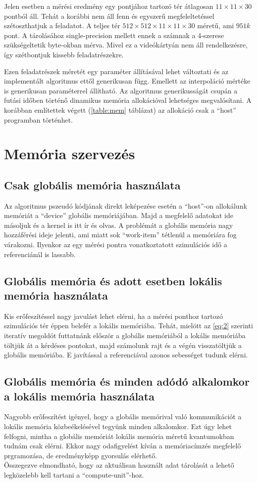 	Jelen esetben a mérési eredmény egy pontjához tartozó tér átlagosan
	$11\times11\times30$ pontból áll.
	Tehát a korábbi nem áll fenn és egyszerű megfeleltetéssel szétoszthatjuk a
	feladatot.
	A teljes tér $512\times512\times11\times11\times30$ méretű, ami $951k$ pont.
	A tárolásához single-precision mellett ennek a számnak a 4-szerese
	szükségeltetik byte-okban mérva. Mivel ez a videókártyán nem áll
	rendelkezésre, így szétbontjuk kissebb feladatrészekre.
	
	Ezen feladatrészek méretét egy paraméter állításával lehet változtati és az
	implementált algoritmus ettől generikusan függ.
	Emellett az interpoláció mértéke is generikusan paraméterrel állítható.
	Az algoritmus generikusságát csupán a futási időben történő dinamikus memória
	allokációval lehetséges megvalósítani. A korábban említettek végett (\ref{table:mem} táblázat)
	az allokáció csak a ``host'' programban történhet.

\section{Memória szervezés}
	\subsection{Csak globális memória használata}
	Az algoritmus pszeudó kódjának direkt leképezése esetén a ``host''-on
	allokálunk memóriát a ``device'' globális memóriájában.
	Majd a megfelelő adatokat ide másoljuk és a kernel is itt ír és olvas.
	A problémát a globális memória nagy hozzáférési ideje jelenti, ami miatt sok
	``work-item'' tétlenül a memóriára fog várakozni.
	Ilyenkor az egy mérési pontra vonatkoztatott szimulációs idő a
	referenciánál is lassabb.
	\subsection{Globális memória és adott esetben lokális memória használata}
	Kis erőfeszítéssel nagy javulást lehet elérni, ha a mérési ponthoz tartozó
	szimulációs tér éppen belefér a lokális memóriába.
	Tehát, mielött az \ref{eq:2} szerinti iteratív megoldót futtatnánk először a
	globális memóriából a lokális memóriába töltjük át a kérdéses pontokat, majd
	számolunk rajt és a végén visszatöltjük a globális memóriába.
	E javítással a referenciával azonos sebességet tudunk elérni.
	\subsection{Globális memória és minden adódó alkalomkor a lokális memória használata}
	Nagyobb erőfeszítést igényel, hogy a globális memórival való kommunikációt a
	lokális memória közbeékelésével tegyünk minden alkalomkor.
	Ezt úgy lehet felfogni, mintha a globális memóriát lokális memória méretű
	kvantumokban tudnám csak elérni.
	Ekkor nagy odafigyelést kíván a memóriacímzés megfelelő prgramozása, de
	eredményképp gyorsulás elérhető. \\
	
	Összegezve elmondható, hogy az aktuálisan használt adat tárolását a lehető
	legközelebb kell tartani a ``compute-unit''-hoz.






